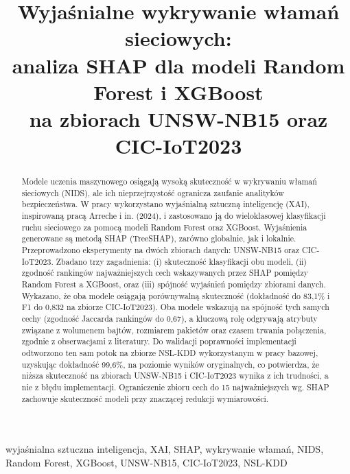 \documentclass[conference]{IEEEtran}
\begin{document}
\title{Wyjaśnialne wykrywanie włamań sieciowych:\\ analiza SHAP dla modeli Random Forest i XGBoost\\ na zbiorach UNSW-NB15 oraz CIC-IoT2023}

\author{
}

\maketitle

\begin{abstract}
Modele uczenia maszynowego osiągają wysoką skuteczność w wykrywaniu włamań sieciowych (NIDS), ale ich nieprzejrzystość ogranicza zaufanie analityków bezpieczeństwa. 
W pracy wykorzystano wyjaśnialną sztuczną inteligencję (XAI), inspirowaną pracą Arreche i in. (2024), i zastosowano ją do wieloklasowej klasyfikacji ruchu sieciowego za pomocą modeli Random Forest oraz XGBoost.
Wyjaśnienia generowane są metodą SHAP (TreeSHAP), zarówno globalnie, jak i lokalnie. Przeprowadzono eksperymenty na dwóch zbiorach danych: UNSW-NB15 oraz CIC-IoT2023. Zbadano trzy zagadnienia: (i) skuteczność klasyfikacji obu modeli, (ii) zgodność rankingów najważniejszych cech wskazywanych przez SHAP pomiędzy Random Forest a XGBoost, oraz (iii) spójność wyjaśnień pomiędzy zbiorami danych. 
Wykazano, że oba modele osiągają porównywalną skuteczność (dokładność do 83,1\% i F1 do 0,832 na zbiorze CIC-IoT2023). 
Oba modele wskazują na spójność tych samych cechy (zgodność Jaccarda rankingów do 0,67), a kluczową rolę odgrywają atrybuty związane z wolumenem bajtów, rozmiarem pakietów oraz czasem trwania połączenia, zgodnie z obserwacjami z literatury. 
Do walidacji poprawności implementacji odtworzono ten sam potok na zbiorze NSL-KDD wykorzystanym w pracy bazowej, uzyskując dokładność 99,6\%, na poziomie wyników oryginalnych, co potwierdza, że niższa skuteczność na zbiorach UNSW-NB15 i CIC-IoT2023 wynika z ich trudności, a nie z błędu implementacji.
Ograniczenie zbioru cech do 15 najważniejszych wg. SHAP zachowuje skuteczność modeli przy znaczącej redukcji wymiarowości.
\end{abstract}

\begin{IEEEkeywords}
wyjaśnialna sztuczna inteligencja, XAI, SHAP, wykrywanie włamań, NIDS, Random Forest, XGBoost, UNSW-NB15, CIC-IoT2023, NSL-KDD
\end{IEEEkeywords}
\end{document}
